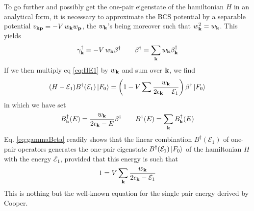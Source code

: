 \documentclass[aps,prb,amsmath,amssymb,preprint,superscriptaddress]{revtex4-1}
\newcommand{\fo}{\ensuremath{\ket{F_0}}}
\renewcommand{\E}{\ensuremath{\mathcal{E}}}
\begin{document}
To go further and possibly get the one-pair eigenstate of the hamiltonian $H$ in an analytical form, it is necessary to  approximate the BCS potential by a separable potential $v_{\mathbf{k}\mathbf{p}}=-V\,w_{\mathbf{k}}{}w_{\mathbf{p}}$, the $w_{\mathbf{k}}$'s being moreover such that $w_{\mathbf{k}}^2=w_{\mathbf{k}}$.  This yields
\begin{equation}\label{eq:gammaBeta}
\gamma^{\dagger}_{\mathbf{k}}=-V\,w_{\mathbf{k}}\beta^{\dagger}\quad\quad\beta^{\dagger}=\sum_{\mathbf{k}}{}w_{\mathbf{k}}\beta^{\dagger}_{\mathbf{k}}
\end{equation}
If we then multiply eq \eqref{eq:HE1} by $w_{\mathbf{k}}$ and sum over $\mathbf{k}$, we find
\begin{equation}
(H-\E_1)B^{\dagger}(\E_1)\fo=\br{1-V\sum{\frac{w_\vk}{2\epsilon_\vk-\E_1}}}\beta^{\dagger}\fo
\end{equation}
in which we have set
\begin{equation}\label{eq:B}
B_{\mathbf{k}}^{\dagger}(E)=\frac{w_{\mathbf{k}}}{2\epsilon_{\mathbf{k}}-E}\beta^{\dagger}\quad\quad B^{\dagger}(E)=\sum_{\mathbf{k}}{B_{\mathbf{k}}^{\dagger}(E)}
\end{equation}
Eq. \eqref{eq:gammaBeta} readily shows that the linear combination  $B^{\dagger}(\E_1)$ of one-pair operators  generates the one-pair eigenstate $B^{\dagger}(\E_1)\fo$ of the hamiltonian $H$ with the energy $\E_1$, provided that this energy is such that
\begin{equation}\label{eq:SchOne}
1=V\sum_\vk{\frac{w_\vk}{2\epsilon_\vk-\E_1}}
\end{equation}
This is nothing but the well-known equation for the single pair energy derived by Cooper.
\end{document}

